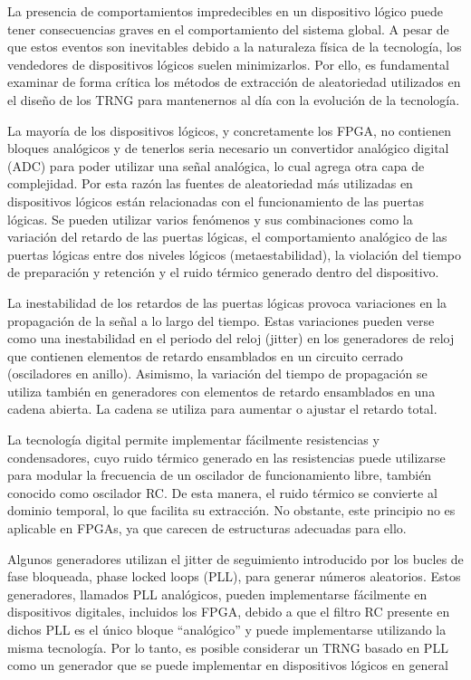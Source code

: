             La presencia de comportamientos impredecibles en un dispositivo lógico puede tener consecuencias graves en el comportamiento del sistema global. A pesar de que estos eventos son inevitables debido a la naturaleza física de la tecnología, los vendedores de dispositivos lógicos suelen minimizarlos. Por ello, es fundamental examinar de forma crítica los métodos de extracción de aleatoriedad utilizados en el diseño de los TRNG para mantenernos al día con la evolución de la tecnología.

            La mayoría de los dispositivos lógicos, y concretamente los FPGA, no contienen bloques analógicos y de tenerlos seria necesario un convertidor analógico digital (ADC) para poder utilizar una señal analógica, lo cual agrega otra capa de complejidad. Por esta razón las fuentes de aleatoriedad más utilizadas en dispositivos lógicos están relacionadas con el funcionamiento de las puertas lógicas. Se pueden utilizar varios fenómenos y sus combinaciones como la variación del retardo de las puertas lógicas, el comportamiento analógico de las puertas lógicas entre dos niveles lógicos (metaestabilidad), la violación del tiempo de preparación y retención y el ruido térmico generado dentro del dispositivo.	
					
	        La inestabilidad de los retardos de las puertas lógicas provoca variaciones en la propagación de la señal a lo largo del tiempo. Estas variaciones pueden verse como una inestabilidad  en el periodo del reloj (jitter) en los generadores de reloj que contienen elementos de retardo ensamblados en un circuito cerrado (osciladores en anillo). Asimismo, la variación del tiempo de propagación se utiliza también en generadores con elementos de retardo ensamblados en una cadena abierta. La cadena se utiliza para aumentar o ajustar el retardo total.

            La tecnología digital permite implementar fácilmente resistencias y condensadores, cuyo ruido térmico generado en las resistencias puede utilizarse para modular la frecuencia de un oscilador de funcionamiento libre, también conocido como oscilador RC. De esta manera, el ruido térmico se convierte al dominio temporal, lo que facilita su extracción. No obstante, este principio no es aplicable en FPGAs, ya que carecen de estructuras adecuadas para ello.

            Algunos generadores utilizan el jitter de seguimiento introducido por los bucles de fase bloqueada, phase locked loops (PLL), para generar números aleatorios. Estos generadores, llamados PLL analógicos, pueden implementarse fácilmente en dispositivos digitales, incluidos los FPGA, debido a que el filtro RC presente en dichos PLL es el único bloque ``analógico'' y puede implementarse utilizando la misma tecnología. Por lo tanto, es posible considerar un TRNG basado en PLL como un generador que se puede implementar en dispositivos lógicos en general
					
